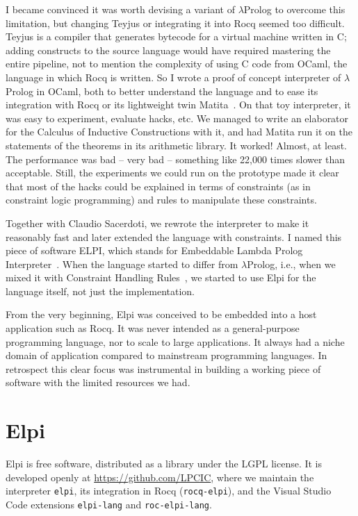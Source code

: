 \documentclass{these-ISSS}
\begin{document}
I became convinced it was worth devising a variant of $\lambda$Prolog to
overcome this limitation, but changing Teyjus or integrating it into Rocq seemed
too difficult. Teyjus is a compiler that generates bytecode for a virtual
machine written in C; adding constructs to the source language would have
required mastering the entire pipeline, not to mention the complexity of using
C code from OCaml, the language in which Rocq is written. So I wrote a proof of
concept interpreter of $\lambda$Prolog in OCaml, both to better understand the
language and to ease its integration with Rocq or its lightweight twin
Matita~\cite{DBLP:conf/cade/AspertiRCT11}. On that toy interpreter, it was easy
to experiment, evaluate hacks, etc. We managed to write an elaborator for
the Calculus of Inductive Constructions with it, and had Matita run it on the
statements of the theorems in its arithmetic library. It worked! Almost, at
least. The performance was bad -- very bad -- something like 22,000 times
slower than acceptable. Still, the experiments we could run on the prototype
made it clear that most of the hacks could be explained in terms of constraints
(as in constraint logic programming) and rules to manipulate these constraints.

Together with Claudio Sacerdoti, we rewrote the interpreter to make it
reasonably fast and later extended the language with constraints. I named this
piece of software ELPI, which stands for Embeddable Lambda Prolog
Interpreter~\cite{dunchev15lpar}. When the language started to differ from
$\lambda$Prolog, i.e., when we mixed it with Constraint Handling
Rules~\cite{FRUHWIRTH199895}, we started to use Elpi for the language itself,
not just the implementation.

From the very beginning, Elpi was conceived to be embedded into a host
application such as Rocq. It was never intended as a general-purpose
programming language, nor to scale to large applications. It always had a niche
domain of application compared to mainstream programming languages.
In retrospect this clear focus was instrumental in building a working
piece of software with the limited resources we had.

\section{Elpi}


Elpi is free software, distributed as a library under the LGPL license. It is
developed openly at \url{https://github.com/LPCIC}, where we maintain the
interpreter \texttt{elpi}, its integration in Rocq (\texttt{rocq-elpi}), and
the Visual Studio Code extensions \texttt{elpi-lang} and \texttt{roc-elpi-lang}.
\end{document}
